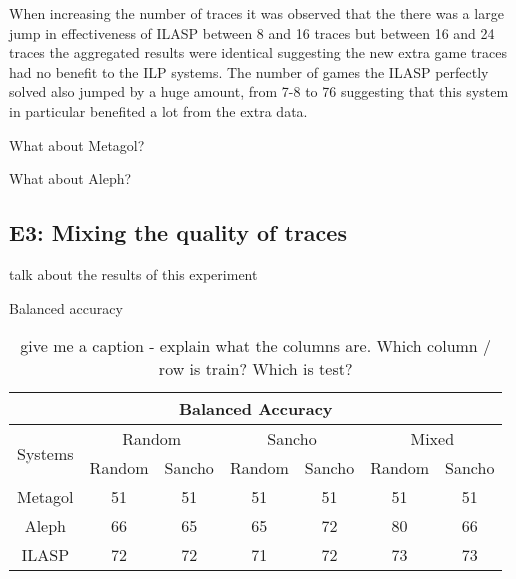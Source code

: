 When increasing the number of traces it was observed that the there was a large jump in effectiveness of ILASP between 8 and 16 traces but between 16 and 24 traces the aggregated results were identical suggesting the new extra game traces had no benefit to the ILP systems. The number of games the ILASP perfectly solved also jumped by a huge amount, from 7-8 to 76 suggesting that this system in particular benefited a lot from the extra data.

\ac{What about Metagol?}

\ac{What about Aleph?}


\subsection{E3: Mixing the quality of traces}
\ac{talk about the results of this experiment}









Balanced accuracy

\begin{table}[]
	\begin{tabular}{|c|c|c|c|c|c|c|}
		\hline
		\multicolumn{7}{|c|}{Balanced Accuracy}                                                                           \\ \hline
		\multirow{2}{*}{Systems} & \multicolumn{2}{c|}{Random} & \multicolumn{2}{c|}{Sancho} & \multicolumn{2}{c|}{Mixed} \\ \cline{2-7}
		& Random       & Sancho       & Random       & Sancho       & Random       & Sancho      \\ \hline
		Metagol                  & 51           & 51           & 51           & 51           & 51           & 51          \\ \hline
		Aleph                    & 66           & 65           & 65           & 72           & 80           & 66          \\ \hline
		ILASP                    & 72           & 72           & 71           & 72           & 73           & 73          \\ \hline
	\end{tabular}
	\label{givemeaname}
	\caption{\ac{give me a caption - explain what the columns are. Which column / row is train? Which is test?}}
\end{table}


